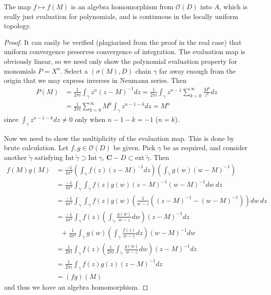 \begin{theorem}
    The map $f \mapsto f(M)$ is an algebra homomorphism from $\mathcal{O}(D)$ into $A$, which is really just evaluation for polynomials, and is continuous in the locally uniform topology.
\end{theorem}
\begin{proof}
    It can easily be verified (plagiarized from the proof in the real case) that uniform convergence preserves convergence of integration. The evaluation map is obviously linear, so we need only show the polynomial evaluation property for monomials $P = X^n$. Select a $(\sigma(M), D)$ chain $\gamma$ far away enough from the origin that we may express inverses in Neumann series. Then
    \begin{align*}
        P(M) &= \frac{1}{2 \pi i} \int_\gamma z^n (z - M)^{-1} dz = \frac{1}{2 \pi i} \int_\gamma z^{n-1} \sum_{k = 0}^\infty \frac{M^k}{z^k} dz\\
        &= \frac{1}{2 \pi i} \sum_{k = 0}^\infty M^k \int_\gamma z^{n - 1 - k} dz = M^n
    \end{align*}
    since $\int_\gamma z^{n-1-k} dz \neq 0$ only when $n - 1 - k = -1$ ($n = k$).

    Now we need to show the multiplicity of the evaluation map. This is done by brute calculation. Let $f,g \in \mathcal{O}(D)$ be given. Pick $\gamma$ be as required, and consider another $\tilde{\gamma}$ satisfying $\text{Int}\ \tilde{\gamma} \supset \overline{\text{Int}\ \gamma}$, $\mathbf{C} - D \subset \text{ext}\ \tilde{\gamma}$. Then
    \begin{align*}
        f(M) g(M) &= \frac{-1}{4 \pi^2} \left( \int_\gamma f(z) (z - M)^{-1} dz \right) \left( \int_{\tilde{\gamma}} g(w) (w - M)^{-1} \right)\\
        &= \frac{-1}{4 \pi^2} \int_\gamma \int_{\tilde{\gamma}} f(z) g(w) (z - M)^{-1} (w - M)^{-1} dw\ dz\\
        &= \frac{-1}{4 \pi^2} \int_\gamma \int_{\tilde{\gamma}} f(z) g(w) \left( \frac{1}{w - z} \left((z - M)^{-1} - (w - M)^{-1} \right) \right) dw\ dz\\
        &= \frac{-1}{4 \pi^2} \int_\gamma f(z) \left( \int_{\tilde{\gamma}} \frac{g(w)}{w - z} dw \right) (z - M)^{-1} dz\\
        &\ \ \ + \frac{1}{4 \pi^2} \int_{\tilde{\gamma}} g(w) \left( \int_\gamma \frac{f(z)}{w - z} dz \right) (w - M)^{-1} dw\\
        &= \frac{1}{2 \pi i} \int_\gamma f(z) \left( \frac{1}{2 \pi i} \int_{\tilde{\gamma}} \frac{g(w)}{w - z} dw \right) (z - M)^{-1} dz\\
        &= \frac{1}{2 \pi i} \int_\gamma f(z) g(z) (z - M)^{-1} dz\\
        &= (fg)(M)
    \end{align*}
    and thus we have an algebra homomorphism.
\end{proof}

